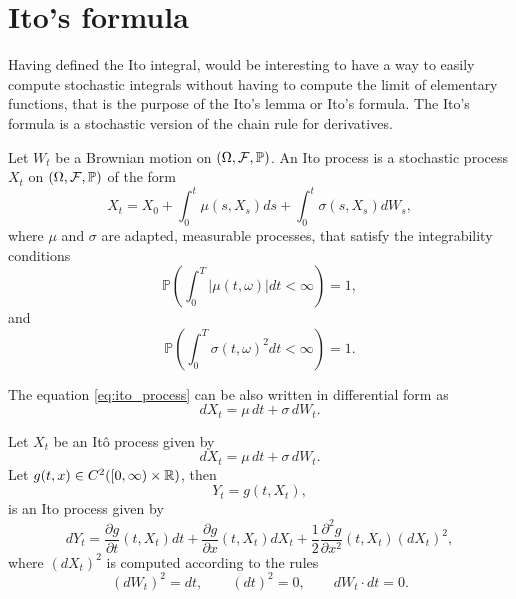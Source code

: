 \section{Ito's formula}

Having defined the Ito integral,
would be interesting to have a way to easily compute stochastic integrals without having to compute the limit of elementary functions,
that is the purpose of the Ito's lemma or Ito's formula.
The Ito's formula is a stochastic version of the chain rule for derivatives.

\begin{definition}
    Let $W_t$ be a Brownian motion on $(\Omega, \mathcal{F}, \mathbb{P})$.
    An Ito process is a stochastic process $X_t$ on $(\Omega, \mathcal{F}, \mathbb{P})$ of the form
    \begin{equation}\label{eq:ito_process}
        X_t = X_0 + \int^{t}_{0} \mu(s, X_s) ds + \int^{t}_{0} \sigma(s, X_s) dW_s,
    \end{equation}
    where $\mu$ and $\sigma$ are adapted, measurable processes, that satisfy the integrability conditions
    \begin{equation*}
        \mathbb{P} \left( \int^{T}_{0} \left| \mu(t, \omega) \right| dt < \infty \right) = 1,
    \end{equation*}
    and
    \begin{equation*}
        \mathbb{P} \left( \int^{T}_{0} \sigma(t, \omega)^2 dt < \infty \right) = 1.
    \end{equation*}
\end{definition}

The equation \eqref{eq:ito_process} can be also written in differential form as
\begin{equation*}
    dX_t = \mu\, dt + \sigma\, dW_t.
\end{equation*}

\begin{theorem}\label{thm:ito_formula}
    Let $X_t$ be an Itô process given by
    \begin{equation*}
        dX_t = \mu\, dt + \sigma\, dW_t.
    \end{equation*}
    Let $g(t, x) \in C^2([0, \infty) \times \mathbb{R})$, then
    \begin{equation*}
        Y_t = g(t, X_t),
    \end{equation*}
    is an Ito process given by
    \begin{equation}\label{eq:ito_formula}
        dY_t = 
            \frac{\partial g}{\partial t}(t, X_t) dt
            + \frac{\partial g}{\partial x}(t, X_t) dX_t
            + \frac{1}{2} \frac{\partial^2 g}{\partial x^2}(t, X_t) (dX_t)^2,
    \end{equation}
    where $(dX_t)^2$ is computed according to the rules
    \begin{equation*}
        (dW_t)^2 = dt, \qquad
        (dt)^2 = 0, \qquad
        dW_t \cdot dt = 0.
    \end{equation*}
\end{theorem}

